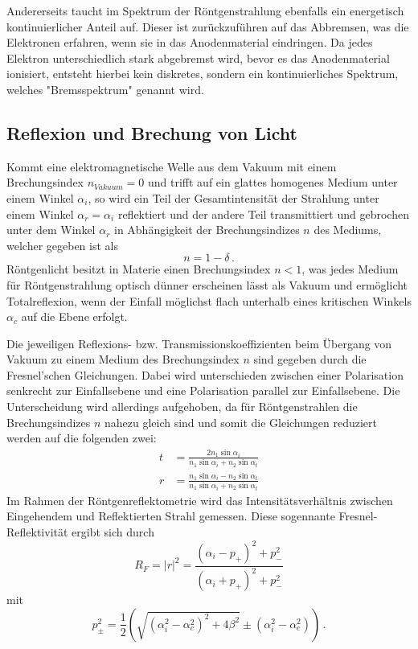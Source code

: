         Andererseits taucht im Spektrum der Röntgenstrahlung ebenfalls ein energetisch kontinuierlicher Anteil auf.
        Dieser ist zurückzuführen auf das Abbremsen, was die Elektronen erfahren, wenn sie in das Anodenmaterial eindringen.
        Da jedes Elektron unterschiedlich stark abgebremst wird, bevor es das Anodenmaterial ionisiert,
        entsteht hierbei kein diskretes, sondern ein kontinuierliches Spektrum, welches "Bremsspektrum" genannt wird.
    \subsection{Reflexion und Brechung von Licht}
        Kommt eine elektromagnetische Welle aus dem Vakuum mit einem Brechungsindex $n_{Vakuum}=0$ und trifft auf ein glattes homogenes Medium unter einem Winkel $\alpha_i$,
        so wird ein Teil der Gesamtintensität der Strahlung unter einem Winkel $\alpha_r=\alpha_i$ reflektiert und
        der andere Teil transmittiert und gebrochen unter dem Winkel $\alpha_r$ in Abhängigkeit der Brechungsindizes $n$
        des Mediums, welcher gegeben ist als
        \begin{equation}
            n=1-\delta \, .
        \end{equation}
        Röntgenlicht besitzt in Materie einen Brechungsindex $n<1$, was jedes Medium für Röntgenstrahlung optisch dünner erscheinen lässt als Vakuum
        und ermöglicht Totalreflexion, wenn der Einfall möglichst flach unterhalb eines kritischen Winkels $\alpha_c$ auf die Ebene erfolgt.

        Die jeweiligen Reflexions- bzw. Transmissionskoeffizienten beim Übergang von Vakuum zu einem Medium des Brechungsindex $n$
        sind gegeben durch die Fresnel'schen Gleichungen. Dabei wird unterschieden zwischen einer Polarisation senkrecht zur Einfallsebene und eine Polarisation parallel zur Einfallsebene.
        Die Unterscheidung wird allerdings aufgehoben, da für Röntgenstrahlen die Brechungsindizes $n$ nahezu gleich sind und somit die Gleichungen reduziert werden auf die folgenden zwei:
        \begin{align}
            t&=\frac{2n_1\sin\alpha_i}{n_1\sin\alpha_i+n_2\sin\alpha_t} \\
            r&=\frac{n_1\sin\alpha_i-n_2\sin\alpha_t}{n_1\sin\alpha_i+n_2\sin\alpha_t}
        \end{align}
        Im Rahmen der Röntgenreflektometrie wird das Intensitätsverhältnis zwischen Eingehendem und Reflektierten Strahl gemessen.
        Diese sogennante Fresnel-Reflektivität ergibt sich durch
        \begin{equation}
            R_F=\vert r\vert^2=\frac{\left(\alpha_i-p_+\right)^2+p_-^2}{\left(\alpha_i+p_+\right)^2+p_-^2}
            \label{eqn:R_F}
        \end{equation}
        mit
        \begin{equation}
            p_\pm^2=\frac{1}{2}\left(\sqrt{\left(\alpha_i^2-\alpha_c^2\right)^2+4\beta^2}\pm\left(\alpha_i^2-\alpha_c^2\right)\right) \, .
            \label{eqn:p}
        \end{equation}
